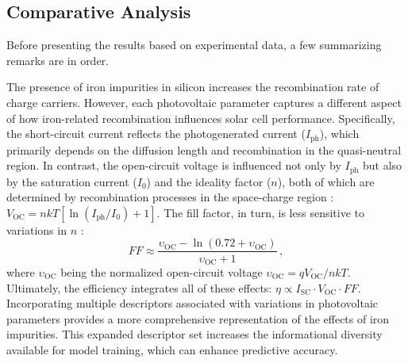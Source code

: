 \documentclass[a4paper,fleqn]{cas-sc}
\begin{document}
\subsection{Comparative Analysis}

Before presenting the results based on experimental data, a few summarizing remarks are in order.

The presence of iron impurities in silicon increases the recombination rate of charge carriers.
However, each photovoltaic parameter captures a different aspect of how iron-related recombination influences solar cell performance.
Specifically, the short-circuit current reflects the photogenerated current ($I_\mathrm{ph}$),
which primarily depends on the diffusion length and recombination in the quasi-neutral region.
In contrast, the open-circuit voltage is influenced not only by $I_\mathrm{ph}$ but also by the saturation current ($I_0$)
and the ideality factor ($n$), both of which are determined by recombination processes in the space-charge region \cite{YangHandbookPVSi}:
$ V_\mathrm{OC} = nkT\left[ {\ln\left( {I_\mathrm{ph}/{I_0}} \right)+1} \right]$.
The fill factor, in turn, is less sensitive to variations in $n$ \cite{Green1982}:
\begin{equation}
\label{eqFF2}
    F\!F \approx \frac{\upsilon_\mathrm{OC}-\ln\left(0.72+\upsilon_\mathrm{OC}\right)}{\upsilon_\mathrm{OC}+1} \,,
\end{equation}
where
$\upsilon_\mathrm{OC}$ being the normalized open-circuit voltage
$\upsilon_\mathrm{OC}=qV_\mathrm{OC}/nkT$.
Ultimately, the efficiency integrates all of these effects: $\eta \propto I_\mathrm{SC}\cdot V_\mathrm{OC}\cdot F\!F$.
Incorporating multiple descriptors associated with variations in photovoltaic parameters provides
a more comprehensive representation of the effects of iron impurities.
This expanded descriptor set increases the informational diversity available for model training, which can enhance predictive accuracy.
\end{document}
